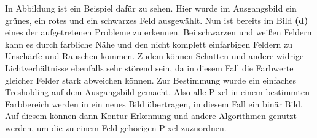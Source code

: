 In Abbildung  ist ein Beispiel dafür zu sehen. Hier wurde im Ausgangsbild ein grünes, ein rotes und ein schwarzes Feld ausgewählt. Nun ist bereits im Bild \textbf{(d)} eines der aufgetretenen Probleme zu erkennen. Bei schwarzen und weißen Feldern kann es durch farbliche Nähe und den nicht komplett einfarbigen Feldern zu Unschärfe und Rauschen kommen. Zudem können Schatten und andere widrige Lichtverhältnisse ebenfalls sehr störend sein, da in diesem Fall die Farbwerte gleicher Felder stark abweichen können. 
Zur Bestimmung wurde ein einfaches Tresholding auf dem Ausgangsbild gemacht. Also alle Pixel in einem bestimmten Farbbereich werden in ein neues Bild übertragen, in diesem Fall ein binär Bild. Auf diesem können dann Kontur-Erkennung und andere Algorithmen genutzt werden, um die zu einem Feld gehörigen Pixel zuzuordnen.


